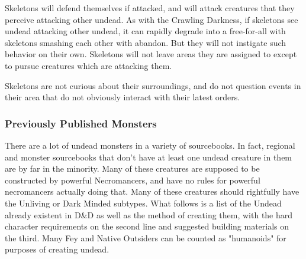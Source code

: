 Skeletons will defend themselves if attacked, and will attack creatures that they perceive attacking other undead. As with the Crawling Darkness, if skeletons see undead attacking other undead, it can rapidly degrade into a free-for-all with skeletons smashing each other with abandon. But they will not instigate such behavior on their own. Skeletons will not leave areas they are assigned to except to pursue creatures which are attacking them.

Skeletons are not curious about their surroundings, and do not question events in their area that do not obviously interact with their latest orders.

\subsubsection{Previously Published Monsters}

There are a lot of undead monsters in a variety of sourcebooks. In fact, regional and monster sourcebooks that don't have at least one undead creature in them are by far in the minority. Many of these creatures are supposed to be constructed by powerful Necromancers, and have no rules for powerful necromancers actually doing that. Many of these creatures should rightfully have the Unliving or Dark Minded subtypes. What follows is a list of the Undead already existent in D\&D as well as the method of creating them, with the hard character requirements on the second line and suggested building materials on the third. Many Fey and Native Outsiders can be counted as "humanoids" for purposes of creating undead.

